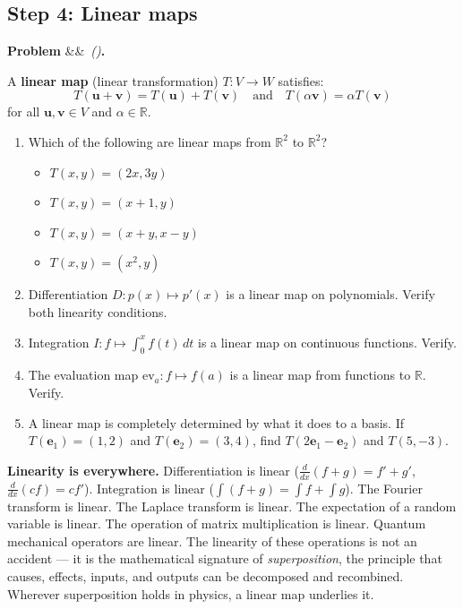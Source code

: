 \documentclass[12pt, a4paper]{article}
\newcounter{problem}
\newenvironment{problem}[1][]{%
  \refstepcounter{problem}%
  \par\vspace{6pt}%
  \noindent\textbf{\color{MidBlue}Problem \theproblem}%
  \ifx&#1&\else\ \textit{(#1)}\fi\textbf{.}\enskip
}{\par\vspace{4pt}}
\begin{document}
\subsection{Step 4: Linear maps}

\begin{problem}
\label{prob:linear_map}
A \textbf{linear map} (linear transformation) $T : V \to W$ satisfies:
\[
  T(\mathbf{u} + \mathbf{v}) = T(\mathbf{u}) + T(\mathbf{v}) \quad \text{and} \quad T(\alpha \mathbf{v}) = \alpha T(\mathbf{v})
\]
for all $\mathbf{u},\mathbf{v} \in V$ and $\alpha \in \mathbb{R}$.

\begin{enumerate}[label=(\alph*), topsep=2pt]
  \item Which of the following are linear maps from $\mathbb{R}^2$ to $\mathbb{R}^2$?
    \begin{itemize}[noitemsep]
      \item $T(x,y) = (2x, 3y)$
      \item $T(x,y) = (x+1, y)$
      \item $T(x,y) = (x+y, x-y)$
      \item $T(x,y) = (x^2, y)$
    \end{itemize}
  \item Differentiation $D : p(x) \mapsto p'(x)$ is a linear map on polynomials. Verify both linearity conditions.
  \item Integration $I : f \mapsto \int_0^x f(t)\,dt$ is a linear map on continuous functions. Verify.
  \item The evaluation map $\text{ev}_a : f \mapsto f(a)$ is a linear map from functions to $\mathbb{R}$. Verify.
  \item A linear map is completely determined by what it does to a basis. If $T(\mathbf{e}_1) = (1,2)$ and $T(\mathbf{e}_2) = (3,4)$, find $T(2\mathbf{e}_1 - \mathbf{e}_2)$ and $T(5, -3)$.
\end{enumerate}
\end{problem}

\begin{thought}
\textbf{Linearity is everywhere.}
Differentiation is linear ($\frac{d}{dx}(f+g) = f'+g'$, $\frac{d}{dx}(cf) = cf'$). Integration is linear ($\int(f+g) = \int f + \int g$). The Fourier transform is linear. The Laplace transform is linear. The expectation of a random variable is linear. The operation of matrix multiplication is linear. Quantum mechanical operators are linear. The linearity of these operations is not an accident --- it is the mathematical signature of \emph{superposition}, the principle that causes, effects, inputs, and outputs can be decomposed and recombined. Wherever superposition holds in physics, a linear map underlies it.
\end{thought}
\end{document}
